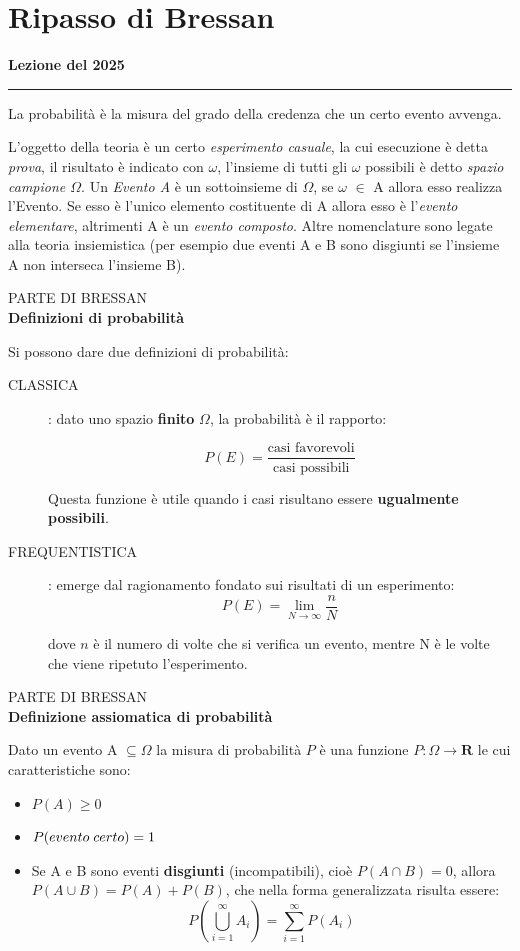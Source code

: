 \documentclass[openany,a4paper,12pt]{book}
\theoremstyle{remark}
\newcommand{\thelezione}{}
\newcommand{\lezioneSenzaIndice}[2]{
\newpage
\renewcommand{\thelezione}{#2} 
\section*{#1} %
\noindent\textbf{\color{RoyalBlue}Lezione del #2}\par\vspace{0.5em}\hrule\vspace{1em}
}
\newcommand{\ripasso}[1]{
    \vspace{2em}\noindent %
    \begin{tcolorbox}[
        enhanced,
        boxrule=0pt,                  %
        frame hidden,                 %
        colback=red!5!white,          %
        borderline west={4pt}{0pt}{red!85!black}, %
        sharp corners,                %
        top=8pt, bottom=8pt, left=12pt, %
        width=\textwidth,
        before skip=0pt, after skip=1.5em %
    ]
        {\small\sffamily\color{red!85!black}\MakeUppercase{Parte di Bressan}}\\[4pt]
        {\Large\bfseries\color{black!85} #1}
    \end{tcolorbox}
    \noindent\ignorespaces %
}
\begin{document}
\justifying

\tableofcontents

\newpage
{}
\setcounter{page}{1}
\pagestyle{fancy}


\lezioneSenzaIndice{Ripasso di Bressan}{2025}
La probabilità è la misura del grado della credenza che un certo evento avvenga.

L'oggetto della teoria è un certo \textit{esperimento casuale}, la cui esecuzione è detta \textit{prova}, il risultato è indicato con \textit{$\omega$}, l'insieme di
tutti gli $\omega$ possibili è detto \textit{spazio campione $\Omega$}. Un \textit{Evento A} è un sottoinsieme di $\Omega$, se $\omega$ $\in$ A allora esso realizza l'Evento.
Se esso è l'unico elemento costituente di A allora esso è l'\textit{evento elementare}, altrimenti A è un \textit{evento composto}.
Altre nomenclature sono legate alla teoria insiemistica (per esempio due eventi A e B sono disgiunti se l'insieme A non interseca l'insieme B).
\ripasso{ Definizioni di probabilità}
Si possono dare due definizioni di probabilità:
\begin{description}

\item[CLASSICA]: dato uno spazio \textbf{finito} $\Omega$, la probabilità è il rapporto:

\[
P(E)= \frac{\text{casi favorevoli}}{\text{casi possibili}}
\]

Questa funzione è utile quando i casi risultano essere \textbf{ugualmente possibili}.

\vspace{0.5cm}

\item[FREQUENTISTICA]: emerge dal ragionamento fondato sui risultati di un esperimento:
\[
P(E)=\lim_{N \rightarrow \infty} \frac{n}{N}
\]

dove $n$ è il numero di volte che si verifica un evento, mentre N è le volte che viene ripetuto l'esperimento.
\end{description}


\ripasso{Definizione assiomatica di probabilità}
Dato un evento A $\subseteq \Omega$ la misura di probabilità $P$ è una funzione $P:\Omega \rightarrow \mathbf{R}  $ le cui caratteristiche sono:



\begin{itemize}
    \item $P(A) \geq 0$
    \item $P (evento \hspace{0.1cm} certo)=1$
    \item  Se A e B sono eventi \textbf{disgiunti} (incompatibili), cioè $P(A \cap B) = 0$, allora $P(A \cup B) = P(A)+P(B)$, che nella forma generalizzata risulta essere:
    \[
    P(\bigcup_{i=1}^{\infty}A_i)=\sum_{i=1}^{\infty}P(A_i)
    \]
\end{itemize}
\end{document}
